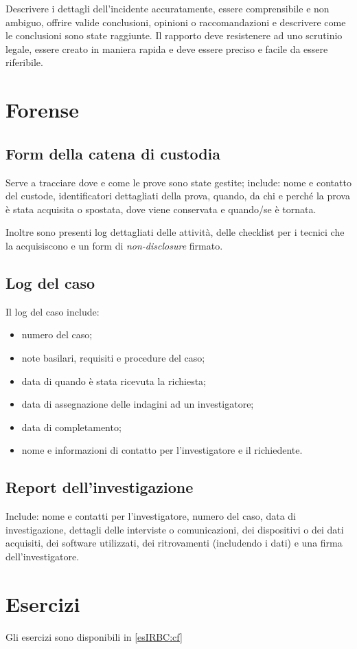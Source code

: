 Descrivere i dettagli dell'incidente accuratamente, essere comprensibile e non
ambiguo, offrire valide conclusioni, opinioni o raccomandazioni e descrivere come
le conclusioni sono state raggiunte. Il rapporto deve resistenere ad uno scrutinio
legale, essere creato in maniera rapida e deve essere preciso e facile da essere
riferibile.

\section{Forense}

\subsection{Form della catena di custodia}

Serve a tracciare dove e come le prove sono state gestite; include:
nome e contatto del custode, identificatori dettagliati della prova, quando,
da chi e perché la prova è stata acquisita o spostata, dove viene conservata
e quando/se è tornata.

Inoltre sono presenti log dettagliati delle attività, delle checklist per i
tecnici che la acquisiscono e un form di \textit{non-disclosure} firmato.

\subsection{Log del caso}

Il log del caso include:
\begin{itemize}
\item numero del caso;
\item note basilari, requisiti e procedure del caso;
\item data di quando è stata ricevuta la richiesta;
\item data di assegnazione delle indagini ad un investigatore;
\item data di completamento;
\item nome e informazioni di contatto per l'investigatore e il richiedente.
\end{itemize}

\subsection{Report dell'investigazione}

Include: nome e contatti per l'investigatore, numero del caso, data di
investigazione, dettagli delle interviste o comunicazioni, dei
dispositivi o dei dati acquisiti, dei software utilizzati, dei ritrovamenti
(includendo i dati) e una firma dell'investigatore.

\section{Esercizi}

Gli esercizi sono disponibili in \ref{esIRBC:cf}
